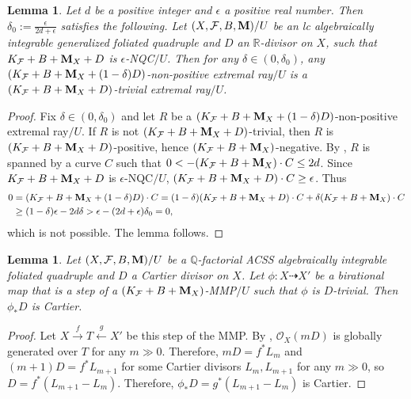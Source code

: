 \documentclass[11pt]{amsart}
\numberwithin{equation}{section}
\newcommand{\Mm}{{\bf{M}}}
\newcommand{\Qq}{\mathbb{Q}}
\newcommand{\Rr}{\mathbb{R}}
\newcommand{\Ff}{\mathcal{F}}
\newtheorem{lem}[thm]{Lemma}
\theoremstyle{definition}
\theoremstyle{definition}
\theoremstyle{definition}
\begin{document}
\begin{lem}\label{lem: trivial ray when -delta}
    Let $d$ be a positive integer and $\epsilon$ a positive real number. Then $\delta_0:=\frac{\epsilon}{2d+\epsilon}$ satisfies the following. Let $(X,\Ff,B,\Mm)/U$ be an lc algebraically integrable generalized foliated quadruple and $D$ an $\Rr$-divisor on $X$, such that  $K_{\Ff}+B+\Mm_X+D$ is $\epsilon$-NQC$/U$. Then for any $\delta\in (0,\delta_0)$, any $(K_{\Ff}+B+\Mm_X+(1-\delta)D)$-non-positive extremal ray$/U$ is a $(K_{\Ff}+B+\Mm_X+D)$-trivial extremal ray$/U$. 
\end{lem}
\begin{proof}
Fix $\delta\in (0,\delta_0)$ and let $R$ be a $(K_{\Ff}+B+\Mm_X+(1-\delta)D)$-non-positive extremal ray$/U$. If $R$ is not $(K_{\Ff}+B+\Mm_X+D)$-trivial, then $R$ is $(K_{\Ff}+B+\Mm_X+D)$-positive, hence $(K_{\Ff}+B+\Mm_X)$-negative. By \cite[Theorem 2.3.1]{CHLX23}, $R$ is spanned by a curve $C$ such that $0<-(K_{\Ff}+B+\Mm_X)\cdot C\leq 2d$. Since $K_{\Ff}+B+\Mm_X+D$ is $\epsilon$-NQC$/U$, $(K_{\Ff}+B+\Mm_X+D)\cdot C\geq\epsilon$. Thus
\begin{align*}
   0&=(K_{\Ff}+B+\Mm_X+(1-\delta)D)\cdot C=(1-\delta)(K_{\Ff}+B+\Mm_X+D)\cdot C+\delta(K_{\Ff}+B+\Mm_X)\cdot C\\
   &\geq (1-\delta)\epsilon-2d\delta>\epsilon-(2d+\epsilon)\delta_0=0,
\end{align*}
which is not possible. The lemma follows.
\end{proof}

\begin{lem}\label{lem: cartier preseve under mmp gfq}
Let $(X,\Ff,B,\Mm)/U$ be a $\Qq$-factorial ACSS algebraically integrable foliated quadruple and $D$ a Cartier divisor on $X$. Let $\phi: X\dashrightarrow X'$ be a birational map that is a step of a $(K_{\Ff}+B+\Mm_X)$-MMP$/U$ such that $\phi$ is $D$-trivial. Then $\phi_*D$ is Cartier.
\end{lem}
\begin{proof}
    Let $X\xrightarrow{f} T\xleftarrow{g} X'$ be this step of the MMP. By \cite[Theorem 16.1.3]{CHLX23}, $\mathcal{O}_X(mD)$ is globally generated over $T$ for any $m\gg 0$. Therefore, $mD=f^*L_m$ and $(m+1)D=f^*L_{m+1}$ for some Cartier divisors $L_m,L_{m+1}$ for any $m\gg 0$, so $D=f^*(L_{m+1}-L_m)$. Therefore, $\phi_*D=g^*(L_{m+1}-L_m)$ is Cartier.
\end{proof}
\end{document}
